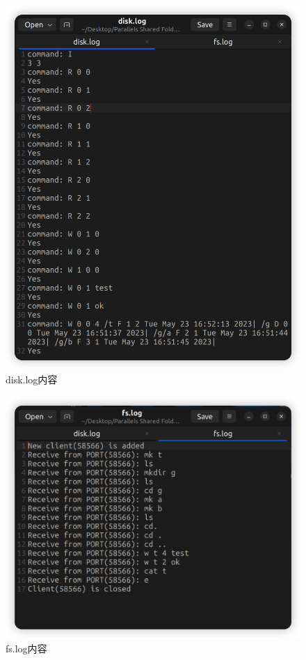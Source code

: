 \documentclass{article}
\begin{document}
\begin{figure}[H]
\center
\includegraphics[scale = 0.4]{s3-t2.png}
\caption{disk.log内容}
\label{s3-t2}
\end{figure}

\begin{figure}[H]
\center
\includegraphics[scale = 0.4]{s3-t3.png}
\caption{fs.log内容}
\label{s3-t3}
\end{figure}
\end{document}
